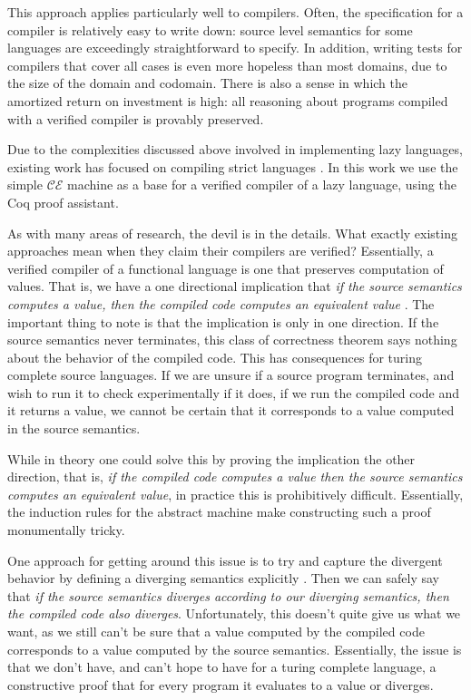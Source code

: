 This approach applies particularly well to compilers. Often, the specification
for a compiler is relatively easy to write down: source level semantics for some
languages are exceedingly straightforward to specify. In addition, writing tests 
for compilers that cover all cases is even more hopeless than most domains, due
to the size of the domain and codomain. There is also a sense in which the
amortized return on investment is high: all reasoning about programs compiled
with a verified compiler is provably preserved. 

Due to the complexities discussed above involved in implementing lazy languages,
existing work has focused on compiling strict languages \cite{chlipala,
cakeml, compcert...}. In this work we use the simple $\mathcal{CE}$ machine as a
base for a verified compiler of a lazy language, using the Coq proof assistant. 

As with many areas of research, the devil is in the details. What exactly
existing approaches mean when they claim their compilers are verified?
Essentially, a verified compiler of a functional language is one that preserves
computation of values. That is, we have a one directional implication that
\emph{if the source semantics computes a value, then the compiled code computes
an equivalent value} \cite{chlipala}. The important thing to note is that the
implication is only in one direction. If the source semantics never terminates,
this class of correctness theorem says nothing about the behavior of the
compiled code. This has consequences for turing complete source languages. If we
are unsure if a source program terminates, and wish to run it to check
experimentally if it does, if we run the compiled code and it returns a value,
we cannot be certain that it corresponds to a value computed in the source
semantics. 

While in theory one could solve this by proving the implication the other
direction, that is, \emph{if the compiled code computes a value then the source
semantics computes an equivalent value}, in practice this is prohibitively
difficult. Essentially, the induction rules for the abstract machine make
constructing such a proof monumentally tricky. 

One approach for getting around this issue is to try and capture the divergent
behavior by defining a diverging semantics explicitly \cite{cakemlesop16}. Then
we can safely say that \emph{if the source semantics diverges according to our
diverging semantics, then the compiled code also diverges}. Unfortunately, this
doesn't quite give us what we want, as we still can't be sure that a value
computed by the compiled code corresponds to a value computed by the source
semantics. Essentially, the issue is that we don't have, and can't hope to have
for a turing complete language, a constructive proof that for every program it
evaluates to a value or diverges.  

